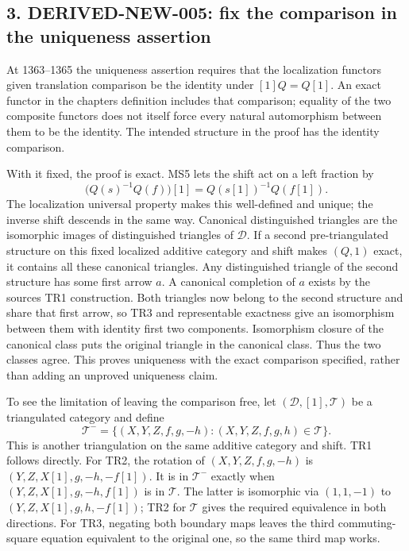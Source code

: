 \subsection{\texorpdfstring{3. DERIVED-NEW-005:\allowbreak{} fix the comparison in the uniqueness assertion}{3.  fix the comparison in the uniqueness assertion}}\label{proofs-1149-1843-derived-new-005-fix-the-comparison-in-the-uniqueness-assertion}

At 1363–\allowbreak{}1365 the uniqueness assertion requires that the localization functor\textquotesingle s given translation comparison be the identity under \([1]Q=Q[1]\). An exact functor in the chapter\textquotesingle s definition includes that comparison; equality of the two composite functors does not itself force every natural automorphism between them to be the identity. The intended structure in the proof has the identity comparison.

With it fixed,\allowbreak{} the proof is exact. MS5 lets the shift act on a left fraction by \[
\bigl(Q(s)^{-1}Q(f)\bigr)[1]=Q(s[1])^{-1}Q(f[1]).
\] The localization universal property makes this well-defined and unique; the inverse shift descends in the same way. Canonical distinguished triangles are the isomorphic images of distinguished triangles of \(\mathcal D\). If a second pre-triangulated structure on this fixed localized additive category and shift makes \((Q,1)\) exact,\allowbreak{} it contains all these canonical triangles. Any distinguished triangle of the second structure has some first arrow \(a\). A canonical completion of \(a\) exists by the source\textquotesingle s TR1 construction. Both triangles now belong to the second structure and share that first arrow,\allowbreak{} so TR3 and representable exactness give an isomorphism between them with identity first two components. Isomorphism closure of the canonical class puts the original triangle in the canonical class. Thus the two classes agree. This proves uniqueness with the exact comparison specified,\allowbreak{} rather than adding an unproved uniqueness claim.

To see the limitation of leaving the comparison free,\allowbreak{} let \((\mathcal D,[1],\mathcal T)\) be a triangulated category and define \[
\mathcal T^-=
\{(X,Y,Z,f,g,-h):(X,Y,Z,f,g,h)\in\mathcal T\}.
\] This is another triangulation on the same additive category and shift. TR1 follows directly. For TR2,\allowbreak{} the rotation of \((X,Y,Z,f,g,-h)\) is \((Y,Z,X[1],g,-h,-f[1])\). It is in \(\mathcal T^-\) exactly when \((Y,Z,X[1],g,-h,f[1])\) is in \(\mathcal T\). The latter is isomorphic via \((1,1,-1)\) to \((Y,Z,X[1],g,h,-f[1])\); TR2 for \(\mathcal T\) gives the required equivalence in both directions. For TR3,\allowbreak{} negating both boundary maps leaves the third commuting-square equation equivalent to the original one,\allowbreak{} so the same third map works.

